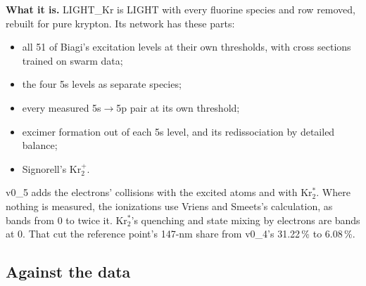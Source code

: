 \documentclass[11pt]{article}
\newcommand{\Krtp}{Kr\ensuremath{_2^+}}
\newcommand{\Krts}{Kr\ensuremath{_2^*}}
\begin{document}
\textbf{What it is.} LIGHT\_Kr is LIGHT with every fluorine species and row
removed, rebuilt for pure krypton. Its network has these parts:
\begin{itemize}
\item all 51 of Biagi's excitation levels at their own thresholds, with
  cross sections trained on swarm data;
\item the four 5s levels as separate species;
\item every measured 5s$\to$5p pair at its own threshold;
\item excimer formation out of each 5s level, and its redissociation by
  detailed balance;
\item Signorell's \Krtp{}.
\end{itemize}
v0\_5 adds the electrons' collisions with the excited atoms and with
\Krts{}. Where nothing is measured, the ionizations use Vriens and Smeets's
calculation, as bands from 0 to twice it. \Krts{}'s quenching and state
mixing by electrons are bands at 0. That cut the reference point's 147-nm
share from v0\_4's 31.22\,\% to 6.08\,\%.

\subsection{Against the data}
\end{document}
